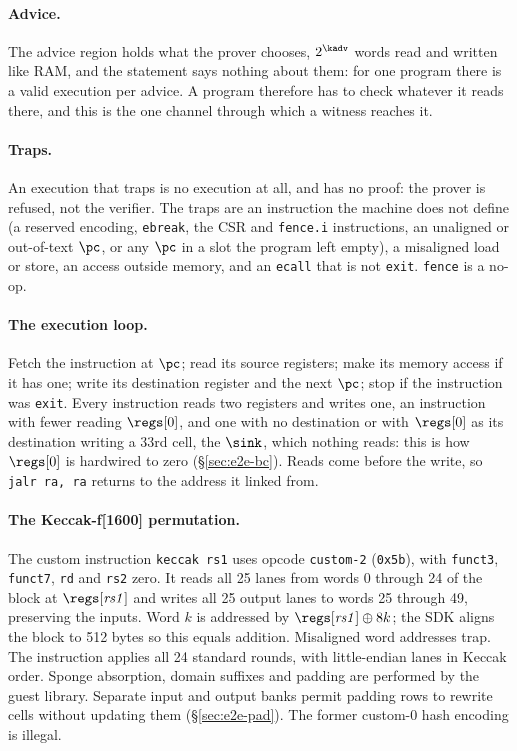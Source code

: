 \paragraph{Advice.} The advice region holds what the prover chooses, $2^{\kadv}$ words read and written like RAM, and the statement says nothing about them: for one program there is a valid execution per advice. A program therefore has to check whatever it reads there, and this is the one channel through which a witness reaches it.

\paragraph{Traps.} An execution that traps is no execution at all, and has no proof: the prover is refused, not the verifier. The traps are an instruction the machine does not define (a reserved encoding, \texttt{ebreak}, the CSR and \texttt{fence.i} instructions, an unaligned or out-of-text $\pc$, or any $\pc$ in a slot the program left empty), a misaligned load or store, an access outside memory, and an \texttt{ecall} that is not \texttt{exit}. \texttt{fence} is a no-op.

\paragraph{The execution loop.} Fetch the instruction at $\pc$; read its source registers; make its memory access if it has one; write its destination register and the next $\pc$; stop if the instruction was \texttt{exit}. Every instruction reads two registers and writes one, an instruction with fewer reading $\regs[0]$, and one with no destination or with $\regs[0]$ as its destination writing a $33$rd cell, the $\sink$, which nothing reads: this is how $\regs[0]$ is hardwired to zero (\S\ref{sec:e2e-bc}). Reads come before the write, so \texttt{jalr ra, ra} returns to the address it linked from.

\paragraph{The Keccak-f[1600] permutation.} The custom instruction \texttt{keccak rs1} uses opcode \texttt{custom-2} (\texttt{0x5b}), with \texttt{funct3}, \texttt{funct7}, \texttt{rd} and \texttt{rs2} zero. It reads all 25 lanes from words 0 through 24 of the block at $\regs[\mathit{rs1}]$ and writes all 25 output lanes to words 25 through 49, preserving the inputs. Word $k$ is addressed by $\regs[\mathit{rs1}]\oplus8k$; the SDK aligns the block to 512 bytes so this equals addition. Misaligned word addresses trap. The instruction applies all 24 standard rounds, with little-endian lanes in Keccak order. Sponge absorption, domain suffixes and padding are performed by the guest library. Separate input and output banks permit padding rows to rewrite cells without updating them (\S\ref{sec:e2e-pad}). The former custom-0 hash encoding is illegal.

